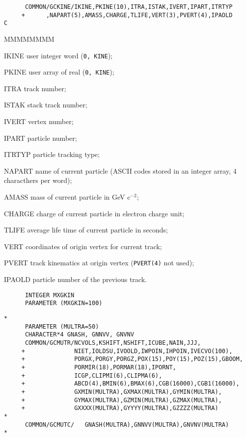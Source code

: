 \begin{verbatim}
      COMMON/GCKINE/IKINE,PKINE(10),ITRA,ISTAK,IVERT,IPART,ITRTYP
     +      ,NAPART(5),AMASS,CHARGE,TLIFE,VERT(3),PVERT(4),IPAOLD
C
\end{verbatim}
\begin{DLtt}{MMMMMMMM}
\item[IKINE]  user integer word  ({\tt 0, KINE});
\item[PKINE]  user array of real   ({\tt 0, KINE});
\item[ITRA]   track number;
\item[ISTAK] stack track number;
\item[IVERT] vertex number;
\item[IPART] particle number;
\item[ITRTYP] particle tracking type;
\item[NAPART] name of current particle (ASCII codes stored in an integer
array, 4 characthers per word);
\item[AMASS]  mass of current particle in GeV c$^{-2}$;
\item[CHARGE] charge of current particle in electron charge unit;
\item[TLIFE] average life time of current particle in seconds;
\item[VERT] coordinates of origin vertex for current track;
\item[PVERT] track kinematics at origin vertex ({\tt PVERT(4)} not used);
\item[IPAOLD] particle number of the previous track.
\end{DLtt}
\begin{verbatim}
      INTEGER MXGKIN
      PARAMETER (MXGKIN=100)
\end{verbatim}
\begin{verbatim}
*
      PARAMETER (MULTRA=50)
      CHARACTER*4 GNASH, GNNVV, GNVNV
      COMMON/GCMUTR/NCVOLS,KSHIFT,NSHIFT,ICUBE,NAIN,JJJ,
     +              NIET,IOLDSU,IVOOLD,IWPOIN,IHPOIN,IVECVO(100),
     +              PORGX,PORGY,PORGZ,POX(15),POY(15),POZ(15),GBOOM,
     +              PORMIR(18),PORMAR(18),IPORNT,
     +              ICGP,CLIPMI(6),CLIPMA(6),
     +              ABCD(4),BMIN(6),BMAX(6),CGB(16000),CGB1(16000),
     +              GXMIN(MULTRA),GXMAX(MULTRA),GYMIN(MULTRA),
     +              GYMAX(MULTRA),GZMIN(MULTRA),GZMAX(MULTRA),
     +              GXXXX(MULTRA),GYYYY(MULTRA),GZZZZ(MULTRA)
*
      COMMON/GCMUTC/   GNASH(MULTRA),GNNVV(MULTRA),GNVNV(MULTRA)
*
\end{verbatim}
